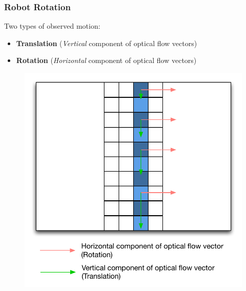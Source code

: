 \documentclass[10pt, compress]{beamer}
\begin{document}
\begin{frame}[fragile]
  \frametitle{Robot Rotation}
  
\vspace{-10pt}

Two types of observed motion:

\begin{itemize}[label={\textbullet}]
  	\item \textbf{Translation} (\textit{Vertical} component of optical flow vectors)
  	\item \textbf{Rotation} (\textit{Horizontal} component of optical flow vectors)
  \end{itemize}

  \begin{figure}[ht!]
\centering
\includegraphics[scale=0.43]{rotation_diag}
  \end{figure}
  
  
\end{frame}
\end{document}
